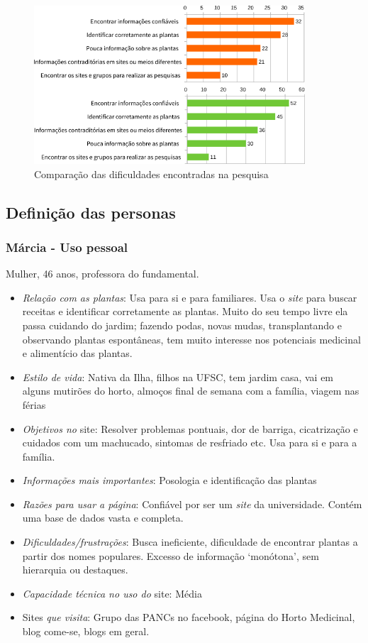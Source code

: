 \begin{figure}[!htbp]
\centering
\caption{\label{graf-prob}Comparação das dificuldades encontradas na pesquisa}
\includegraphics[width=0.9\textwidth]{images/drive/image_18.png}
\end{figure}


\subsection{Definição das personas}\label{definicao-das-personas}

\subsubsection{Márcia - Uso pessoal}

Mulher, 46 anos, professora do fundamental.

\begin{itemize}
\item
  \emph{Relação com as plantas}: Usa para si e para familiares. Usa o \emph{site} para buscar receitas e identificar corretamente as plantas. Muito do seu tempo livre ela passa cuidando do jardim; fazendo podas, novas mudas, transplantando e observando plantas espontâneas, tem muito interesse nos potenciais medicinal e alimentício das plantas.
\item
  \emph{Estilo de vida}: Nativa da Ilha, filhos na UFSC, tem jardim casa, vai em alguns mutirões do horto, almoços final de semana com a família, viagem nas férias
\item
  \emph{Objetivos no} site: Resolver problemas pontuais, dor de barriga, cicatrização e cuidados com um machucado, sintomas de resfriado etc. Usa para si e para a família.
\item
  \emph{Informações mais importantes}: Posologia e identificação das plantas
\item
  \emph{Razões para usar a página}: Confiável por ser um \emph{site} da universidade. Contém uma base de dados vasta e completa.
\item
  \emph{Dificuldades/frustrações}: Busca ineficiente, dificuldade de encontrar plantas a partir dos nomes populares. Excesso de informação `monótona', sem hierarquia ou destaques.
\item
  \emph{Capacidade técnica no uso do} site: Média
\item
  Sites \emph{que visita}: Grupo das PANCs no facebook, página do Horto Medicinal, blog come-se, blogs em geral.
\end{itemize}

